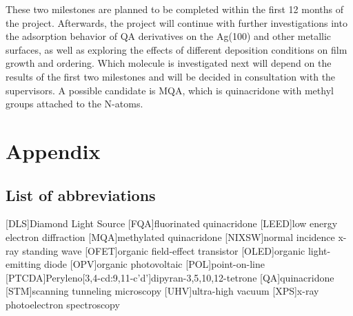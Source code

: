 \documentclass[11pt, a4paper]{scrreprt}
\begin{document}
These two milestones are planned to be completed within the first 12 months of the project. Afterwards, the project will continue with further investigations into the adsorption behavior of \ac{QA} derivatives on the Ag(100) and other metallic surfaces, as well as exploring the effects of different deposition conditions on film growth and ordering. Which molecule is investigated next will depend on the results of the first two milestones and will be decided in consultation with the supervisors. A possible candidate is \ac{MQA}, which is quinacridone with methyl groups attached to the N-atoms.

\newpage
\chapter{Appendix}
\label{sec:appendix}

\section*{List of abbreviations}
\begin{acronym}
  [DLS]{Diamond Light Source}
  [FQA]{fluorinated quinacridone}
  [LEED]{low energy electron diffraction}
  [MQA]{methylated quinacridone}
  [NIXSW]{normal incidence x-ray standing wave}
  [OFET]{organic field-effect transistor}
  [OLED]{organic light-emitting diode}
  [OPV]{organic photovoltaic}
  [POL]{point-on-line}
  [PTCDA]{Peryleno[3,4-cd:9,11-c'd']dipyran-3,5,10,12-tetrone}
  [QA]{quinacridone}
  [STM]{scanning tunneling microscopy}
  [UHV]{ultra-high vacuum}
  [XPS]{x-ray photoelectron spectroscopy}
\end{acronym}

\printbibliography[heading=bibliography]
\end{document}
